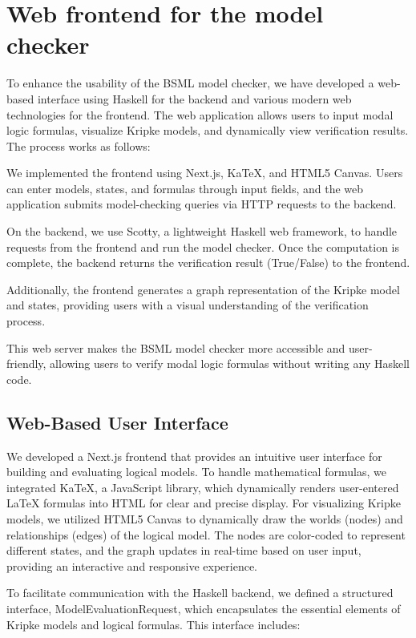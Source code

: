 \section{Web frontend for the model checker}\label{sec:Web}

To enhance the usability of the BSML model checker, we have developed a web-based interface using Haskell for the backend and various modern web technologies for the frontend. The web application allows users to input modal logic formulas, visualize Kripke models, and dynamically view verification results. The process works as follows:

We implemented the frontend using Next.js, KaTeX, and HTML5 Canvas. Users can enter models, states, and formulas through input fields, and the web application submits model-checking queries via HTTP requests to the backend.

On the backend, we use Scotty, a lightweight Haskell web framework, to handle requests from the frontend and run the model checker. Once the computation is complete, the backend returns the verification result (True/False) to the frontend.

Additionally, the frontend generates a graph representation of the Kripke model and states, providing users with a visual understanding of the verification process.

This web server makes the BSML model checker more accessible and user-friendly, allowing users to verify modal logic formulas without writing any Haskell code.

\subsection{Web-Based User Interface}
We developed a Next.js frontend that provides an intuitive user interface for building and evaluating logical models.  To handle mathematical formulas, we integrated KaTeX, a JavaScript library, which dynamically renders user-entered LaTeX formulas into HTML for clear and precise display. For visualizing Kripke models, we utilized HTML5 Canvas to dynamically draw the worlds (nodes) and relationships (edges) of the logical model. The nodes are color-coded to represent different states, and the graph updates in real-time based on user input, providing an interactive and responsive experience.

To facilitate communication with the Haskell backend, we defined a structured interface, ModelEvaluationRequest, which encapsulates the essential elements of Kripke models and logical formulas. This interface includes:

